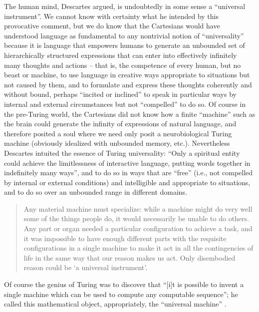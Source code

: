 \documentclass[output=paper]{langsci/langscibook}
\begin{document}
The human mind, Descartes argued, is undoubtedly in some sense a “universal
instrument”. We cannot know with certainty what he intended by this provocative
comment, but we do know that the Cartesians would have understood language as
fundamental to any nontrivial notion of “universality” because it is language
that empowers humans to generate an unbounded set of hierarchically structured
expressions that can enter into effectively infinitely many thoughts and
actions – that is, the competence of every human, but no beast or machine, to
use language in creative ways appropriate to situations but not caused by them,
and to formulate and express these thoughts coherently and without bound,
perhaps “incited or inclined” to speak in particular ways by internal and
external circumstances but not “compelled” to do so. Of course in the
pre-Turing world, the Cartesians did not know how a finite “machine” such as
the brain could generate the infinity of expressions of natural language, and
therefore posited a soul where we need only posit a neurobiological Turing
machine (obviously idealized with unbounded memory, etc.). Nevertheless
Descartes intuited the essence of Turing universality: “Only a spiritual entity
could achieve the limitlessness of interactive language, putting words together
in indefinitely many ways”, and to do so in ways that are “free” (i.e., not
compelled by internal or external conditions) and intelligible and appropriate
to situations, and to do so over an unbounded range in different domains.
\blockquote{Any material machine must specialize: while a machine might do very
    well some of the things people do, it would necessarily be unable to do
    others. Any part or organ needed a particular configuration to achieve a
    task, and it was impossible to have enough different parts with the
    requisite configurations in a single machine to make it act in all the
    contingencies of life in the same way that our reason makes us act. Only
disembodied reason could be ‘a universal instrument’.\hfill\citep[63]{Riskin2017}}
Of course the genius of Turing was to discover that “[i]t is possible to invent
a single machine which can be used to compute any computable sequence”; he
called this mathematical object, appropriately, the “universal machine”
\citep[243]{Turing1936}.
\end{document}
